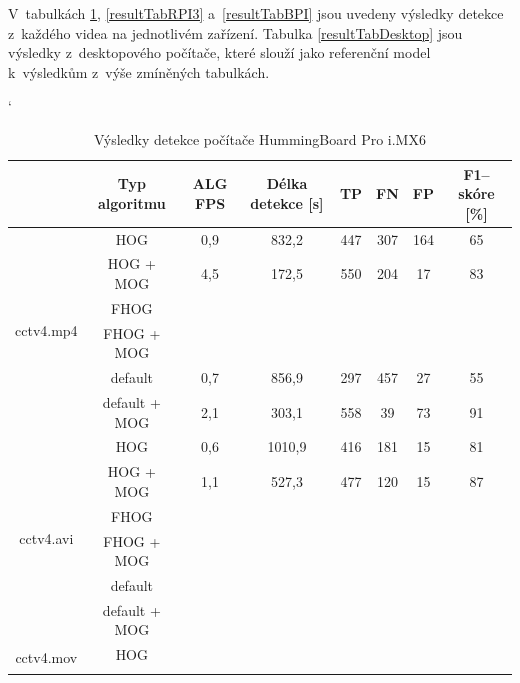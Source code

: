 V~tabulkách \ref{resultTabIMX}, \ref{resultTabRPI3} a~\ref{resultTabBPI} jsou uvedeny výsledky detekce z~každého videa na jednotlivém zařízení. Tabulka \ref{resultTabDesktop} jsou výsledky z~desktopového počítače, které slouží jako referenční model k~výsledkům z~výše zmíněných tabulkách.  
\begin{table}[H]
\catcode`
\centering
\caption{Výsledky detekce počítače HummingBoard Pro i.MX6 }
\label{resultTabIMX}
\begin{tabular}{|c|c|c|c|c|c|c|c|}
\hline
                         & Typ algoritmu   	& ALG FPS & Délka detekce [s] & TP  & FN  & FP  & F1--skóre [\%] \\ \hline
\multirow{6}{*}{cctv4.mp4} & HOG        	&   0,9   &      832,2        & 447 & 307 & 164 &    65          \\ \cline{2-8} 
                         & HOG + MOG  		&   4,5   &      172,5        & 550 & 204 & 17  &    83          \\ \cline{2-8}  
                         & FHOG       		&         &                   &     &     &     &                \\ \cline{2-8}  
                         & FHOG + MOG 		&         &                   &     &     &     &                \\ \cline{2-8}  
                         & default	 		&   0,7   &      856,9        & 297 & 457 & 27  &    55          \\ \cline{2-8}  
                         & default + MOG	&   2,1   &      303,1        & 558 & 39  & 73  &    91          \\ \hline\hline 
\multirow{6}{*}{cctv4.avi} & HOG        	&   0,6   &     1010,9        & 416 & 181 &  15 &    81          \\ \cline{2-8} 
                         & HOG + MOG  		&   1,1   &      527,3        & 477 & 120 & 15  &    87          \\ \cline{2-8}  
                         & FHOG       		&      &              &  &  &   &          \\ \cline{2-8} 
                         & FHOG + MOG 		&         &                   &     &     &     &          \\ \cline{2-8} 
                         &  default 		&         &                   &     &     &     &          \\ \cline{2-8}  
                         & default + MOG	&         &                   &     &     &     &          \\ \hline \hline
\multirow{6}{*}{cctv4.mov} & HOG        	&         &                   &     &     &     &          \\ \cline{2-8} 

\end{tabular}
\end{table}
